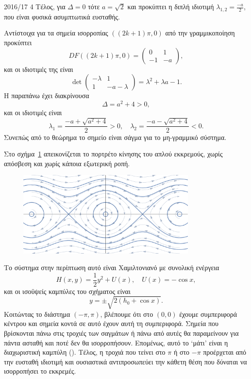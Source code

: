 \begin{solution}{2016/17 4}
    Τέλος, για \( \Delta = 0 \) τότε \( a = \sqrt{2} \) και προκύπτει η διπλή
    ιδιοτιμή \( \lambda_{1,2} = \frac{-a}{2} \), που είναι φυσικά ασυμπτωτικά
    ευσταθής.

    Αντίστοιχα για τα σημεία ισορροπίας \( ((2k + 1)\pi, 0) \) από την γραμμικοποίηση προκύπτει
    \[
        DF((2k + 1)\pi, 0) = \begin{pmatrix}
            0 & 1 \\
            -1 & -a
        \end{pmatrix},
    \]
    και οι ιδιοτιμές της είναι
    \[
        \det
        \begin{pmatrix}
            -\lambda & 1 \\
            1 & -a - \lambda
        \end{pmatrix}
        = \lambda^2 + \lambda a - 1.
    \]
    Η παραπάνω έχει διακρίνουσα
    \[
        \Delta = a^2 + 4 > 0,
    \]
    και οι ιδιοτιμές είναι
    \[
        \lambda_1 = \frac{-a + \sqrt{a^2 + 4}}{2} > 0, \quad
        \lambda_2 = \frac{-a - \sqrt{a^2 + 4}}{2} < 0.
    \]
    Συνεπώς από το θεώρημα  το σημείο είναι
    σάγμα για το μη-γραμμικό σύστημα.

    Στο σχήμα~\ref{fig:ex4_undampedPendComb} απεικονίζεται το πορτρέτο κίνησης
    του απλού εκκρεμούς, χωρίς απόσβεση και χωρίς κάποια εξωτερική ροπή.
    \begin{figure}[h]
        \centering
        \includegraphics[width=0.8\textwidth]{figures/ex4_undampedPendComb.pdf}
        \caption{}
        \label{fig:ex4_undampedPendComb}
    \end{figure}
    Το σύστημα στην περίπτωση αυτό είναι Χαμιλτονιανό με συνολική ενέργεια
    \[
        H(x, y) = \frac{1}{2}y^2 + U(x),\quad U(x) = - \cos{x},
    \]
    και οι ισοϋψείς καμπύλες του σχήματος είναι
    \[
        y = \pm \sqrt{2(h_0 + \cos{x})}.
    \]
    Κοιτώντας το διάστημα \( (-\pi, \pi) \), βλέπουμε ότι στο \( (0, 0) \) έχουμε
    συμπεριφορά κέντρου και σημεία κοντά σε αυτό έχουν αυτή τη συμπεριφορά. Σημεία
    που βρίσκονται πάνω στις τροχιές των σαγμάτων ή πάνω από αυτές θα παραμείνουν
    για πάντα ασταθή και ποτέ δεν θα ισορροπήσουν. Επομένως, αυτό το
    \enquote*{μάτι} είναι η διαχωριστική καμπύλη (). Τέλος, η
    τροχιά που τείνει στο \( \pi \) ή στο \( -\pi \) προέρχεται από την ευσταθή
    ιδιοτιμή και ουσιαστικά αντιπροσωπεύει την κάθετη θέση που δύναται να
    ισορροπήσει το εκκρεμές.


\end{solution}
